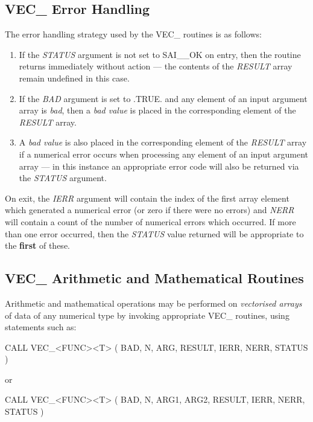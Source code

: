 \documentclass[11pt,nolof]{starlink}
\providecommand{\name}[1]{\mbox{#1}}
\providecommand{\fortvar}[1]{\mbox{\emph{#1}}}
\begin{document}
\subsection{\name{VEC\_} Error Handling}
\label{section:vec:error}

The error handling strategy used by the \name{VEC\_} routines is as follows:

\begin{enumerate}

\item If the \fortvar{STATUS} argument is not set to \name{SAI\_\_OK} on
entry, then the routine returns immediately without action ---
the contents of the \fortvar{RESULT} array remain undefined in this case.

\item If the \fortvar{BAD} argument is set to \name{.TRUE.} and any
element of an input argument array is \emph{bad}, then a \emph{bad value} is
placed in the corresponding element of the \fortvar{RESULT} array.

\item A \emph{bad value} is also placed in the corresponding element of the
\fortvar{RESULT} array if a numerical error occurs when processing any
element of an input argument array --- in this instance an appropriate
error code will also be returned via the \fortvar{STATUS} argument.

\end{enumerate}

On exit, the \fortvar{IERR} argument will contain the index of the first
array element which generated a numerical error (or zero if there were no
errors) and \fortvar{NERR} will contain a count of the number of
numerical errors which occurred.
If more than one error occurred, then the \fortvar{STATUS} value returned will
be appropriate to the \textbf{first} of these.

\subsection{\name{VEC\_} Arithmetic and Mathematical Routines}

Arithmetic and mathematical operations may be performed on \emph{vectorised
arrays} of data of any numerical type by invoking appropriate \name{VEC\_}
routines, using statements such as:

\begin{terminalv}
CALL VEC_<FUNC><T> ( BAD, N, ARG, RESULT, IERR, NERR, STATUS )
\end{terminalv}
or
\begin{terminalv}
CALL VEC_<FUNC><T> ( BAD, N, ARG1, ARG2, RESULT, IERR, NERR, STATUS )
\end{terminalv}
\end{document}
